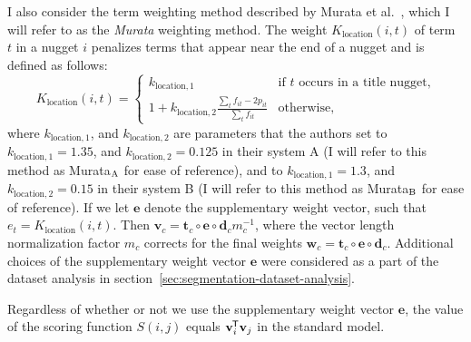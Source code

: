 \documentclass[
  digital, %
  notable, %
  lof,     %
  lot,     %
  nopalatino, color
]{fithesis3}
\let\term\emph
\newcommand*{\tran}{^{\mkern-1.5mu\mathsf{T}}}
\let\emph=\textit
\begin{document}
I also consider the term weighting method described by Murata et
al.~\cite{murataetal00}, which I will refer to as the
\term{Murata} weighting method. The weight
$K_{\textrm{location}}(i, t)$ of term~$t$ in a nugget $i$
penalizes terms that appear near the end of a nugget and is defined as follows:
\begin{equation*}
  K_{\textrm{location}}(i, t) = \begin{cases}
    k_{\textrm{location},1} & \text{if $t$ occurs in a title nugget,} \\
    1 + k_{\textrm{location},2}\frac{\sum_t f_{it}-2p_{it}}{\sum_t f_{it}} & \text{otherwise,}
  \end{cases}
\end{equation*}
where $k_{\textrm{location},1}$, and $k_{\textrm{location},2}$ are
parameters that the authors set to $k_{\textrm{location},1}=1.35$, and
$k_{\textrm{location},2}=0.125$ in their system A (I will refer to this
method as Murata$_{\textrm A}$ for ease
of reference), and to
$k_{\textrm{location},1}=1.3$, and $k_{\textrm{location},2}=0.15$ in their
system B (I will refer to this method as Murata$_{\textrm
B}$ for ease of reference). If we let
$\mathbf{e}$ denote the supplementary weight
vector, such that $e_t = K_{\textrm{location}}(i, t)$. Then
$\mathbf{v}_c=\mathbf{t}_c\circ\mathbf{e}\circ\mathbf{d}_cm_c^{-1}$, where
the vector length normalization factor $m_c$ corrects for the final weights
$\mathbf{w}_c=\mathbf{t}_c\circ\mathbf{e}\circ\mathbf{d}_c$. Additional
choices of the supplementary weight vector $\mathbf{e}$
were considered as a part of the dataset analysis in
section~\ref{sec:segmentation-dataset-analysis}.

Regardless of whether or not we use the supplementary weight vector
$\mathbf{e}$, the value of the scoring function $S(i,
j)$ equals $\mathbf v_i\tran \mathbf v_j$ in the standard
model.
\end{document}

